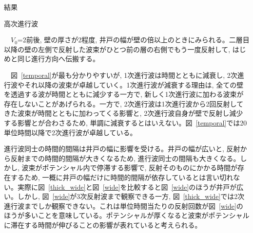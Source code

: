 \documentclass[a4paper, lualatex]{bxjsarticle}
\newcommand{\fref}[1]{図~\ref{#1}}
\begin{document}
\begin{section}{結果}
\begin{subsection}{高次進行波}
\begin{figure}[h]
\begin{minipage}{0.5\hsize}
            \end{minipage}
        \end{figure}
    \par　$V_0$=2前後, 壁の厚さが2程度, 井戸の幅が壁の倍以上のときにみられる。二層目以降の壁の左側で反射した波束がひとつ前の層の右側でもう一度反射して, はじめと同じ進行方向へ伝搬する。
    \par　\fref{temporal}が最も分かりやすいが, 1次進行波は時間とともに減衰し, 2次進行波やそれ以降の波束が卓越していく。1次進行波が減衰する理由は, 全ての壁を透過する波が時間とともに減少する一方で, 新しく1次進行波に加わる波束が存在しないことがあげられる。一方で, 2次進行波は1次進行波から2回反射してきた波束が時間とともに加わってくる影響と, 2次進行波自身が壁で反射し減少する影響とが合わさるため, 単調に減衰するとはいえない。\fref{temporal}では20単位時間以降で2次進行波が卓越している。
    \par 進行波同士の時間的間隔は井戸の幅に影響を受ける。井戸の幅が広いと, 反射から反射までの時間的間隔が大きくなるため, 進行波同士の間隔も大きくなる。しかし, 波束がポテンシャル内で停滞する影響で, 反射そのものにかかる時間が存在する\cite{Goto}ため, 一概に井戸の幅だけに時間的間隔が依存しているとは言い切れない。実際に\fref{thick_wide}と\fref{wide}を比較すると\fref{wide}のほうが井戸が広い。しかし, \fref{wide}が3次反射波まで観察できる一方, \fref{thick_wide}では2次進行波までしか観察できない。これは単位時間当たりの反射回数が\fref{wide}のほうが多いことを意味している。ポテンシャルが厚くなると波束がポテンシャルに滞在する時間が伸びることの影響が表れていると考えられる。
    \end{subsection}


\end{section}
\end{document}
